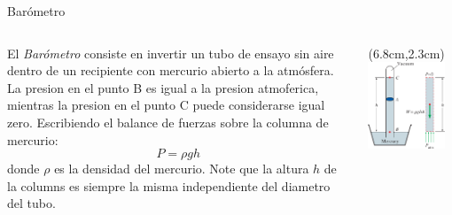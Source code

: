 \documentclass [xcolor=svgnames, t] {beamer}
\begin{document}
\begin{frame}{Bar\'ometro}
\begin{columns}
\vspace{-1cm}
\begin{block}{}
El \emph{Bar\'ometro} consiste en invertir un tubo de ensayo sin aire dentro de un recipiente con mercurio abierto a la atm\'osfera.  La presion en el punto B es igual a la presion atmoferica, mientras la presion en el punto C puede considerarse igual zero. Escribiendo el balance de fuerzas sobre la columna de mercurio:
$$
P = \rho g h
$$
donde $\rho$ es la densidad del mercurio. Note que la altura $h$ de la columns es siempre la misma independiente del diametro del tubo. 
\end{block}
\begin{textblock*}{6.5cm}(6.8cm,2.3cm) %
\includegraphics[width=0.9\textwidth]{baro1}
\end{textblock*}
\end{columns}
\end{frame}
\end{document}
